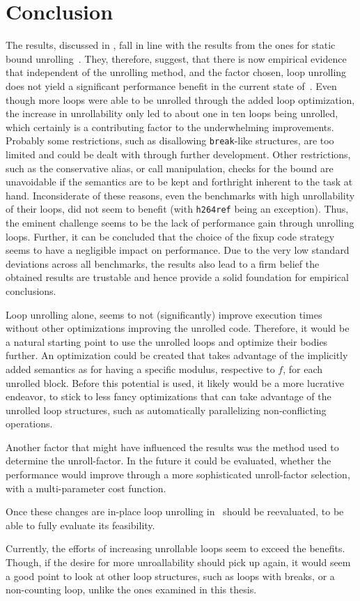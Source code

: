 \chapter{Conclusion}\label{sec:conclusion}

The results, discussed in , fall in line with the results from the ones for static bound unrolling~\cite{aebi18bachelorarbeit}.
They, therefore, suggest, that there is now empirical evidence that independent of the unrolling method, and the factor chosen, loop unrolling does not yield a significant performance benefit in the current state of~\libFIRM.
Even though more loops were able to be unrolled through the added loop optimization, the increase in unrollability only led to about one in ten loops being unrolled, which certainly is a contributing factor to the underwhelming improvements.
Probably some restrictions, such as disallowing \texttt{break}-like structures, are too limited and could be dealt with through further development.
Other restrictions, such as the conservative alias, or call manipulation, checks for the bound are unavoidable if the semantics are to be kept and forthright inherent to the task at hand.
Inconsiderate of these reasons, even the benchmarks with high unrollability of their loops, did not seem to benefit (with \texttt{h264ref} being an exception).
Thus, the eminent challenge seems to be the lack of performance gain through unrolling loops.
Further, it can be concluded that the choice of the fixup code strategy seems to have a negligible impact on performance.
Due to the very low standard deviations across all benchmarks, the results also lead to a firm belief the obtained results are trustable and hence provide a solid foundation for empirical conclusions.

Loop unrolling alone, seems to not (significantly) improve execution times without other optimizations improving the unrolled code.
Therefore, it would be a natural starting point to use the unrolled loops and optimize their bodies further.
An optimization could be created that takes advantage of the implicitly added semantics as for having a specific modulus, respective to $f$, for each unrolled block.
Before this potential is used, it likely would be a more lucrative endeavor, to stick to less fancy optimizations that can take advantage of the unrolled loop structures, such as automatically parallelizing non-conflicting operations.

Another factor that might have influenced the results was the method used to determine the unroll-factor.
In the future it could be evaluated, whether the performance would improve through a more sophisticated unroll-factor selection, with a multi-parameter cost function.

Once these changes are in-place loop unrolling in~\libFIRM{} should be reevaluated, to be able to fully evaluate its feasibility.

Currently, the efforts of increasing unrollable loops seem to exceed the benefits.
Though, if the desire for more unroallability should pick up again, it would seem a good point to look at other loop structures, such as loops with breaks, or a non-counting loop, unlike the ones examined in this thesis.
